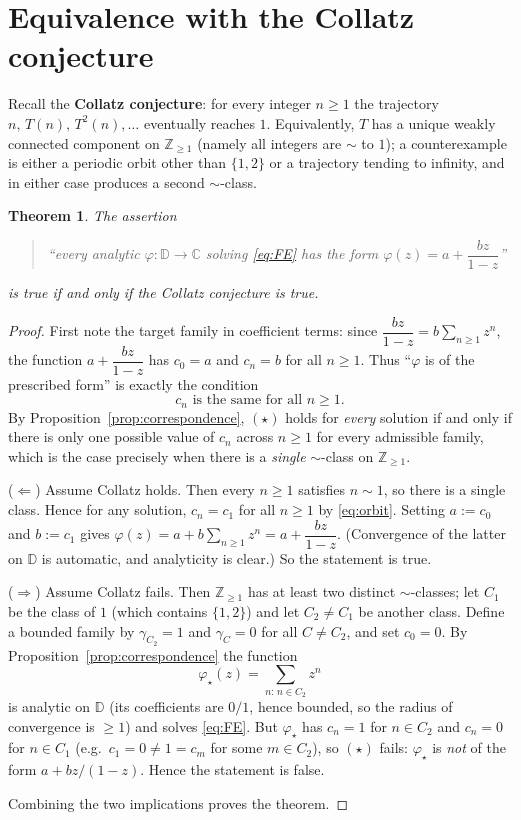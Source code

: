 \documentclass{amsart}
\newtheorem{theorem}{Theorem}
\theoremstyle{remark}
\begin{document}
\section{Equivalence with the Collatz conjecture}

Recall the \textbf{Collatz conjecture}: for every integer $n\ge1$ the trajectory
$n,\,T(n),\,T^2(n),\dots$ eventually reaches $1$. Equivalently, $T$ has a unique
weakly connected component on $\mathbb{Z}_{\ge1}$ (namely all integers are $\sim$ to $1$); a
counterexample is either a periodic orbit other than $\{1,2\}$ or a trajectory tending to
infinity, and in either case produces a second $\sim$-class.

\begin{theorem}\label{thm:main}
The assertion
\begin{quote}
``every analytic $\varphi:\mathbb{D}\to\mathbb{C}$ solving \eqref{eq:FE} has the form
$\varphi(z)=a+\dfrac{bz}{1-z}$''
\end{quote}
is true if and only if the Collatz conjecture is true.
\end{theorem}

\begin{proof}
First note the target family in coefficient terms: since
$\dfrac{bz}{1-z}=b\sum_{n\ge1}z^n$, the function $a+\dfrac{bz}{1-z}$ has $c_0=a$ and $c_n=b$ for
all $n\ge1$. Thus ``$\varphi$ is of the prescribed form'' is exactly the condition
\[
c_n \text{ is the same for all } n\ge1.
\tag{$\star$}
\]
By Proposition~\ref{prop:correspondence}, $(\star)$ holds for \emph{every} solution if and only
if there is only one possible value of $c_n$ across $n\ge1$ for every admissible family, which is
the case precisely when there is a \emph{single} $\sim$-class on $\mathbb{Z}_{\ge1}$.

($\Leftarrow$) Assume Collatz holds. Then every $n\ge1$ satisfies $n\sim 1$, so there is a single
class. Hence for any solution, $c_n=c_1$ for all $n\ge1$ by \eqref{eq:orbit}. Setting $a:=c_0$ and
$b:=c_1$ gives $\varphi(z)=a+b\sum_{n\ge1}z^n=a+\dfrac{bz}{1-z}$. (Convergence of the latter on
$\mathbb{D}$ is automatic, and analyticity is clear.) So the statement is true.

($\Rightarrow$) Assume Collatz fails. Then $\mathbb{Z}_{\ge1}$ has at least two distinct
$\sim$-classes; let $C_1$ be the class of $1$ (which contains $\{1,2\}$) and let $C_2\ne C_1$ be
another class. Define a bounded family by $\gamma_{C_2}=1$ and $\gamma_C=0$ for all $C\ne C_2$,
and set $c_0=0$. By Proposition~\ref{prop:correspondence} the function
\[
\varphi_\star(z)=\sum_{n:\,n\in C_2} z^n
\]
is analytic on $\mathbb{D}$ (its coefficients are $0/1$, hence bounded, so the radius of
convergence is $\ge1$) and solves \eqref{eq:FE}. But $\varphi_\star$ has $c_n=1$ for
$n\in C_2$ and $c_n=0$ for $n\in C_1$ (e.g.\ $c_1=0\ne 1=c_{m}$ for some $m\in C_2$), so
$(\star)$ fails: $\varphi_\star$ is \emph{not} of the form $a+bz/(1-z)$. Hence the statement is
false.

Combining the two implications proves the theorem.
\end{proof}
\end{document}
